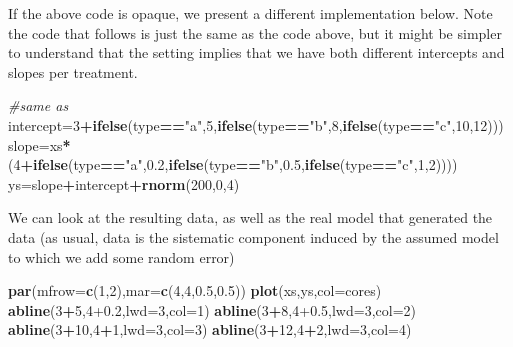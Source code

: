 \documentclass[
]{book}
\newenvironment{Shaded}{\begin{snugshade}}{\end{snugshade}}
\newcommand{\CommentTok}[1]{\textcolor[rgb]{0.56,0.35,0.01}{\textit{#1}}}
\newcommand{\DataTypeTok}[1]{\textcolor[rgb]{0.13,0.29,0.53}{#1}}
\newcommand{\DecValTok}[1]{\textcolor[rgb]{0.00,0.00,0.81}{#1}}
\newcommand{\FloatTok}[1]{\textcolor[rgb]{0.00,0.00,0.81}{#1}}
\newcommand{\KeywordTok}[1]{\textcolor[rgb]{0.13,0.29,0.53}{\textbf{#1}}}
\newcommand{\NormalTok}[1]{#1}
\newcommand{\OperatorTok}[1]{\textcolor[rgb]{0.81,0.36,0.00}{\textbf{#1}}}
\newcommand{\StringTok}[1]{\textcolor[rgb]{0.31,0.60,0.02}{#1}}
\begin{document}
If the above code is opaque, we present a different implementation below. Note the code that follows is just the same as the code above, but it might be simpler to understand that the setting implies that we have both different intercepts and slopes per treatment.

\begin{Shaded}
\begin{Highlighting}[]
\CommentTok{#same as}
\NormalTok{intercept=}\DecValTok{3}\OperatorTok{+}\KeywordTok{ifelse}\NormalTok{(type}\OperatorTok{==}\StringTok{"a"}\NormalTok{,}\DecValTok{5}\NormalTok{,}\KeywordTok{ifelse}\NormalTok{(type}\OperatorTok{==}\StringTok{"b"}\NormalTok{,}\DecValTok{8}\NormalTok{,}\KeywordTok{ifelse}\NormalTok{(type}\OperatorTok{==}\StringTok{"c"}\NormalTok{,}\DecValTok{10}\NormalTok{,}\DecValTok{12}\NormalTok{)))}
\NormalTok{slope=xs}\OperatorTok{*}\NormalTok{(}\DecValTok{4}\OperatorTok{+}\KeywordTok{ifelse}\NormalTok{(type}\OperatorTok{==}\StringTok{"a"}\NormalTok{,}\FloatTok{0.2}\NormalTok{,}\KeywordTok{ifelse}\NormalTok{(type}\OperatorTok{==}\StringTok{"b"}\NormalTok{,}\FloatTok{0.5}\NormalTok{,}\KeywordTok{ifelse}\NormalTok{(type}\OperatorTok{==}\StringTok{"c"}\NormalTok{,}\DecValTok{1}\NormalTok{,}\DecValTok{2}\NormalTok{))))}
\NormalTok{ys=slope}\OperatorTok{+}\NormalTok{intercept}\OperatorTok{+}\KeywordTok{rnorm}\NormalTok{(}\DecValTok{200}\NormalTok{,}\DecValTok{0}\NormalTok{,}\DecValTok{4}\NormalTok{)}
\end{Highlighting}
\end{Shaded}

We can look at the resulting data, as well as the real model that generated the data (as usual, data is the sistematic component induced by the assumed model to which we add some random error)

\begin{Shaded}
\begin{Highlighting}[]
\KeywordTok{par}\NormalTok{(}\DataTypeTok{mfrow=}\KeywordTok{c}\NormalTok{(}\DecValTok{1}\NormalTok{,}\DecValTok{2}\NormalTok{),}\DataTypeTok{mar=}\KeywordTok{c}\NormalTok{(}\DecValTok{4}\NormalTok{,}\DecValTok{4}\NormalTok{,}\FloatTok{0.5}\NormalTok{,}\FloatTok{0.5}\NormalTok{))}
\KeywordTok{plot}\NormalTok{(xs,ys,}\DataTypeTok{col=}\NormalTok{cores)}
\KeywordTok{abline}\NormalTok{(}\DecValTok{3}\OperatorTok{+}\DecValTok{5}\NormalTok{,}\DecValTok{4}\FloatTok{+0.2}\NormalTok{,}\DataTypeTok{lwd=}\DecValTok{3}\NormalTok{,}\DataTypeTok{col=}\DecValTok{1}\NormalTok{)}
\KeywordTok{abline}\NormalTok{(}\DecValTok{3}\OperatorTok{+}\DecValTok{8}\NormalTok{,}\DecValTok{4}\FloatTok{+0.5}\NormalTok{,}\DataTypeTok{lwd=}\DecValTok{3}\NormalTok{,}\DataTypeTok{col=}\DecValTok{2}\NormalTok{)}
\KeywordTok{abline}\NormalTok{(}\DecValTok{3}\OperatorTok{+}\DecValTok{10}\NormalTok{,}\DecValTok{4}\OperatorTok{+}\DecValTok{1}\NormalTok{,}\DataTypeTok{lwd=}\DecValTok{3}\NormalTok{,}\DataTypeTok{col=}\DecValTok{3}\NormalTok{)}
\KeywordTok{abline}\NormalTok{(}\DecValTok{3}\OperatorTok{+}\DecValTok{12}\NormalTok{,}\DecValTok{4}\OperatorTok{+}\DecValTok{2}\NormalTok{,}\DataTypeTok{lwd=}\DecValTok{3}\NormalTok{,}\DataTypeTok{col=}\DecValTok{4}\NormalTok{)}
\end{Highlighting}
\end{Shaded}
\end{document}
